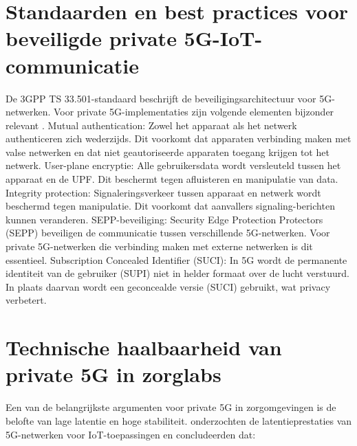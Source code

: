 \section{Standaarden en best practices voor beveiligde private 5G-IoT-communicatie}
De 3GPP TS 33.501-standaard beschrijft de beveiligingsarchitectuur voor 5G-netwerken. Voor private 5G-implementaties zijn volgende elementen bijzonder relevant \autocite{3GPP2024}.
\vspace{0.5cm}
Mutual authentication: Zowel het apparaat als het netwerk authenticeren zich wederzijds. Dit voorkomt dat apparaten verbinding maken met valse netwerken en dat niet geautoriseerde apparaten toegang krijgen tot het netwerk.
\vspace{0.5cm}
User-plane encryptie: Alle gebruikersdata wordt versleuteld tussen het apparaat en de UPF. Dit beschermt tegen afluisteren en manipulatie van data.
\vspace{0.5cm}
Integrity protection: Signaleringsverkeer tussen apparaat en netwerk wordt beschermd tegen manipulatie. Dit voorkomt dat aanvallers signaling-berichten kunnen veranderen.
\vspace{0.5cm}
SEPP-beveiliging: Security Edge Protection Protectors (SEPP) beveiligen de communicatie tussen verschillende 5G-netwerken. Voor private 5G-netwerken die verbinding maken met externe netwerken is dit essentieel.
\vspace{0.5cm}
Subscription Concealed Identifier (SUCI): In 5G wordt de permanente identiteit van de gebruiker (SUPI) niet in helder formaat over de lucht verstuurd. In plaats daarvan wordt een geconcealde versie (SUCI) gebruikt, wat privacy verbetert.
\vspace{0.5cm}
\section{Technische haalbaarheid van private 5G in zorglabs}
\vspace{0.5cm}
Een van de belangrijkste argumenten voor private 5G in zorgomgevingen is de belofte van lage latentie en hoge stabiliteit. \autocite{LowLatency2018} onderzochten de latentieprestaties van 5G-netwerken voor IoT-toepassingen en concludeerden dat:

